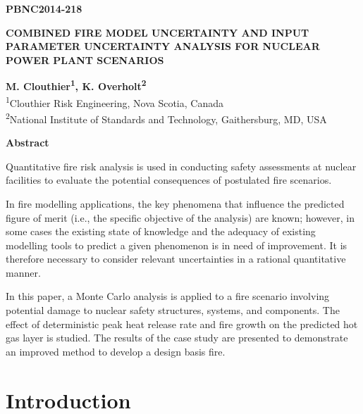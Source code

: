 \documentclass[12pt]{article}
\begin{document}
\begin{flushright}
\textbf{PBNC2014-218}
\end{flushright}

\begin{center}
\textbf{COMBINED FIRE MODEL UNCERTAINTY AND INPUT PARAMETER UNCERTAINTY ANALYSIS FOR NUCLEAR POWER PLANT SCENARIOS}
\end{center}

\begin{center}
\textbf{M. Clouthier\textsuperscript{1}, K. Overholt\textsuperscript{2}}\\

\textsuperscript{1}Clouthier Risk Engineering, Nova Scotia, Canada\\
\textsuperscript{2}National Institute of Standards and Technology, Gaithersburg, MD, USA
\end{center}

\begin{center}
\textbf{Abstract}
\end{center}

Quantitative fire risk analysis is used in conducting safety assessments at nuclear facilities to evaluate the potential consequences of postulated fire scenarios.

In fire modelling applications, the key phenomena that influence the predicted figure of merit (i.e., the specific objective of the analysis) are known; however, in some cases the existing state of knowledge and the adequacy of existing modelling tools to predict a given phenomenon is in need of improvement. It is therefore necessary to consider relevant uncertainties in a rational quantitative manner.

In this paper, a Monte Carlo analysis is applied to a fire scenario involving potential damage to nuclear safety structures, systems, and components. The effect of deterministic peak heat release rate and fire growth on the predicted hot gas layer is studied. The results of the case study are presented to demonstrate an improved method to develop a design basis fire.

\section{Introduction}
\label{sec:introduction}


\end{document}
